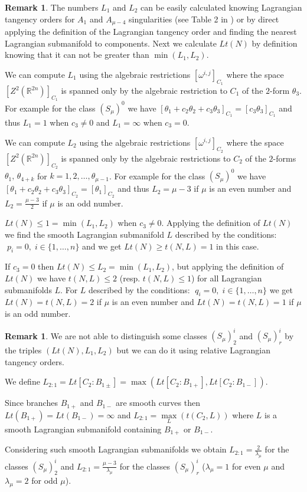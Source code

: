 \documentclass{amsart}
\theoremstyle{definition}
\newtheorem{rem}[thm]{Remark}
\numberwithin{equation}{section}
\begin{document}
\begin{rem}
The numbers $L_1$ and $L_2$ can be easily calculated knowing Lagrangian tangency orders for $A_1$ and $A_{\mu-4}$ singularities (see Table 2 in \cite{DT}) or by direct applying the definition of the Lagrangian tangency order and finding the nearest Lagrangian submanifold to components. Next we calculate $Lt(N)$ by definition knowing that it can not be greater than $\min(L_1,L_2)$.

We can compute $L_1$ using the algebraic restrictions $[\omega ^{i,j}]_{C_1}$ where the space $[Z^2 (\mathbb R^{2n})]_{C_1}$ is spanned only by the algebraic restriction to $C_1$ of the $2$-form $\theta_3$. For example for the class $(S_{\mu})^0$ we have $[\theta_1+c_2\theta_2+c_3\theta_3]_{C_1}=[c_3\theta_3]_{C_1}$ and thus $L_1=1$ when $c_3\ne0$ and $L_1=\infty$ when $c_3=0$.

We can compute $L_2$ using the algebraic restrictions $[\omega ^{i,j}]_{C_2}$ where the space $[Z^2 (\mathbb R^{2n})]_{C_2}$ is spanned only by the algebraic restrictions to $C_2$ of the $2$-forms $\theta_1, \,\theta_{4+k}$ for $k=1,2,\ldots,\theta_{\mu-1}$. For example for the class $(S_{\mu})^0$ we have $[ \theta_1+c_2\theta_2+c_3\theta_3]_{C_2}=[\theta_1]_{C_2}$ and thus $L_2= \mu-3$ if $\mu$ is an even number and $L_2= \frac{\mu-3}{2}$ if $\mu$ is an odd number.

$Lt(N)\leq1=\min(L_1,L_2)$ when $c_3\ne0$. Applying the definition of $Lt(N)$ we find the smooth Lagrangian submanifold $L$ described by the conditions: $\;p_i=0,\; i\in \{1,\ldots,n\}$ and we get $Lt(N)\geq t(N,L)=1$ in this case.

If $c_3=0$ then $Lt(N)\leq L_2=\min(L_1,L_2)$, but applying the definition of $Lt(N)$ we have $t(N,L)\leq2$ (resp. $t(N,L)\leq1$) for all Lagrangian submanifolds $L$. For $L$ described by the conditions: $\;q_i=0,\; i\in \{1,\ldots,n\}$ we get $Lt(N)= t(N,L)=2$ if $\mu$ is an even number and $Lt(N)= t(N,L)=1$ if $\mu$ is an odd number.

\end{rem}

\begin{rem} \label{s-relative}
We are not able to distinguish some classes $(S_{\mu})^{i}_2$ and $(S_{\mu})^{i}_r$ by the triples $(Lt(N), L_1, L_2)$ but we can do it using relative Lagrangian tangency orders.

\smallskip

\noindent We define $L_{2:1}=Lt[C_2:B_{1\pm}]=\max(Lt[C_2:B_{1+}],Lt[C_2:B_{1-}])$.

\smallskip

\noindent Since branches $B_{1+}$ and $B_{1-}$ are smooth curves then $Lt(B_{1+})=Lt(B_{1-})=\infty$ and $L_{2:1}=\max\limits _L (t(C_{2},L))$ where $L$ is a smooth Lagrangian submanifold containing $B_{1+}$ or $B_{1-}$.

\noindent Considering such smooth Lagrangian submanifolds  we obtain
$L_{2:1}=\frac{2}{\lambda_{\mu}}$ for the classes $(S_{\mu})^{i}_2$ and $L_{2:1}=\frac{\mu-3}{\lambda_{\mu}}$ for the classes $(S_{\mu})^{i}_r$ ($\lambda_{\mu}\!=1$ for even $\mu$ and $\lambda_{\mu}\!=2$ for odd $\mu$).

\end{rem}
\end{document}
